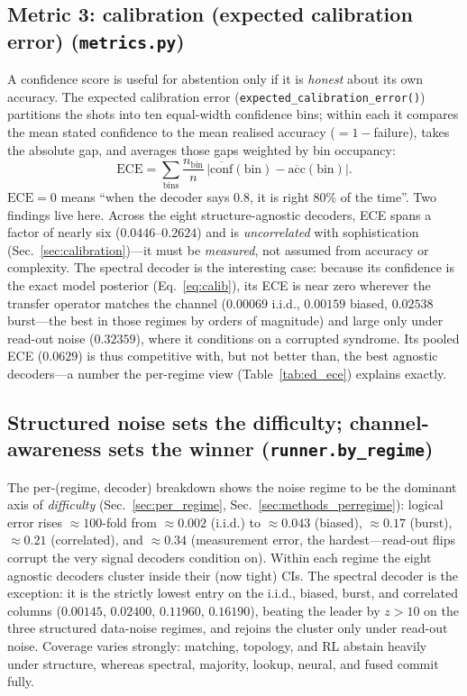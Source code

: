 \documentclass[reprint,aps,prxquantum,amsmath,amssymb,floatfix,nofootinbib,longbibliography]{revtex4-2}
\theoremstyle{definition}
\theoremstyle{remark}
\theoremstyle{plain}
\begin{document}
\subsection{Metric 3: calibration (expected calibration error) (\texttt{metrics.py})}
\label{sec:si_calibration}
A confidence score is useful for abstention only if it is \emph{honest} about its own accuracy. The expected calibration error (\texttt{expected\_calibration\_error()}) partitions the shots into ten equal-width confidence bins; within each it compares the mean stated confidence to the mean realised accuracy ($=1-$failure), takes the absolute gap, and averages those gaps weighted by bin occupancy:
\begin{equation}
  \mathrm{ECE} = \sum_{\text{bins}} \frac{n_{\mathrm{bin}}}{n}\,
  \bigl\lvert \overline{\mathrm{conf}}(\mathrm{bin}) - \overline{\mathrm{acc}}(\mathrm{bin}) \bigr\rvert .
\end{equation}
$\mathrm{ECE}=0$ means ``when the decoder says $0.8$, it is right $80\%$ of the time''. Two findings live here. Across the eight structure-agnostic decoders, ECE spans a factor of nearly six ($0.0446$--$0.2624$) and is \emph{uncorrelated} with sophistication (Sec.~\ref{sec:calibration})---it must be \emph{measured}, not assumed from accuracy or complexity. The spectral decoder is the interesting case: because its confidence is the exact model posterior (Eq.~\eqref{eq:calib}), its ECE is near zero wherever the transfer operator matches the channel ($0.00069$ i.i.d., $0.00159$ biased, $0.02538$ burst---the best in those regimes by orders of magnitude) and large only under read-out noise ($0.32359$), where it conditions on a corrupted syndrome. Its pooled ECE ($0.0629$) is thus competitive with, but not better than, the best agnostic decoders---a number the per-regime view (Table~\ref{tab:ed_ece}) explains exactly.

\subsection{Structured noise sets the difficulty; channel-awareness sets the winner (\texttt{runner.by\_regime})}
\label{sec:si_regimes}
The per-(regime, decoder) breakdown shows the noise regime to be the dominant axis of \emph{difficulty} (Sec.~\ref{sec:per_regime}, Sec.~\ref{sec:methods_perregime}): logical error rises $\approx100$-fold from $\approx0.002$ (i.i.d.) to $\approx0.043$ (biased), $\approx0.17$ (burst), $\approx0.21$ (correlated), and $\approx0.34$ (measurement error, the hardest---read-out flips corrupt the very signal decoders condition on). Within each regime the eight agnostic decoders cluster inside their (now tight) CIs. The spectral decoder is the exception: it is the strictly lowest entry on the i.i.d., biased, burst, and correlated columns ($0.00145$, $0.02400$, $0.11960$, $0.16190$), beating the leader by $z>10$ on the three structured data-noise regimes, and rejoins the cluster only under read-out noise. Coverage varies strongly: matching, topology, and RL abstain heavily under structure, whereas spectral, majority, lookup, neural, and fused commit fully.
\end{document}
